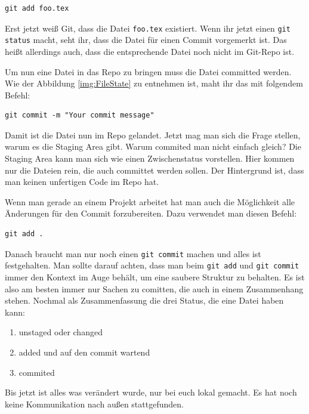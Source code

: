 \documentclass[a4paper,11pt]{scrartcl}	%
\begin{document}
		\begin{lstlisting}[frame=single]
git add foo.tex
		\end{lstlisting}

	Erst jetzt weiß Git, dass die Datei \texttt{foo.tex} existiert. Wenn ihr jetzt einen \texttt{git status} macht,
	seht ihr, dass die Datei für einen Commit vorgemerkt ist. Das heißt allerdings auch, dass die entsprechende Datei
	noch nicht im Git-Repo ist.\par
	Um nun eine Datei in das Repo zu bringen muss die Datei committed werden. Wie der Abbildung \ref{img:FileState} zu
	entnehmen ist, maht ihr	das mit folgendem Befehl:

		\begin{lstlisting}[frame=single]
git commit -m "Your commit message"
		\end{lstlisting}

	Damit ist die Datei nun im Repo gelandet. Jetzt mag man sich die Frage stellen, warum es die Staging Area gibt.
	Warum commited man nicht einfach gleich? Die Staging Area kann man sich wie einen Zwischenstatus vorstellen.
	Hier kommen nur die Dateien rein, die auch committet werden sollen. Der Hintergrund ist, dass man keinen unfertigen
	Code im Repo hat.\par
	Wenn man gerade an einem Projekt arbeitet hat man auch die Möglichkeit alle Änderungen für den Commit forzubereiten.
	Dazu verwendet man diesen Befehl:

		\begin{lstlisting}[frame=single]
git add .
		\end{lstlisting}

	Danach braucht man nur noch einen \texttt{git commit} machen und alles ist festgehalten. Man sollte darauf achten, dass
	man beim \texttt{git add} und \texttt{git commit} immer den Kontext im Auge behält, um eine saubere Struktur zu 
	behalten. Es ist also am besten immer nur Sachen zu comitten, die auch in einem Zusammenhang stehen. Nochmal als
	Zusammenfassung die drei Status, die eine Datei haben kann: 
	

		\begin{enumerate}
			\item unstaged oder changed
			\item added und auf den commit wartend
			\item commited
		\end{enumerate}

	Bis jetzt ist alles was verändert wurde, nur bei euch lokal gemacht. Es hat noch keine Kommunikation nach außen
	stattgefunden. 
\end{document}
